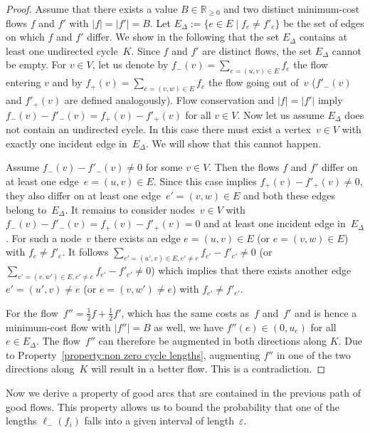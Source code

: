 \documentclass[11pt]{article}
\newcommand{\RR}{\mathbb{R}}
\newcommand{\e}{\varepsilon}
\renewcommand{\sp}{\ell}
\newcommand{\spm}[1][]{\sp^{#1}_{-}}
\begin{document}
\begin{proof}
Assume that there exists a value $B \in \RR_{\geq 0}$ and two distinct minimum-cost flows $f$ and $f'$ with $|f| = |f'| = B$. Let $E_{\Delta} := \{e \in E \mid f_e \neq f'_e\}$ be the set of edges on which $f$ and $f'$ differ. We show in the following that the set $E_{\Delta}$ contains at least one undirected cycle~$K$.
Since $f$ and $f'$ are distinct flows, the set $E_{\Delta}$ cannot be empty. For $v \in V$, let us denote by $f_-(v) = \sum_{e=(u,v) \in E} f_e$ the flow entering $v$ and by $f_+(v) = \sum_{e=(v,w) \in E} f_e$ the flow going out of~$v$ ($f'_-(v)$ and $f'_+(v)$ are defined analogously). Flow conservation and $|f| = |f'|$ imply $f_-(v) - f'_-(v) = f_+(v) - f'_+(v)$ for all $v \in V$. 
Now let us assume $E_{\Delta}$ does not contain an undirected cycle. In this case there must exist a vertex~$v \in V$ with exactly one incident edge in~$E_{\Delta}$. We will show that this cannot happen.

Assume $f_-(v) - f'_-(v) \neq 0$ for some $v \in V$. Then the flows $f$ and $f'$ differ on at least one edge~$e = (u,v) \in E$. Since this case implies $f_+(v) - f'_+(v) \neq 0$, they also differ on at least one edge~$e' = (v,w) \in E$ and both these edges belong to~$E_{\Delta}$. It remains to consider nodes~$v \in V$ with $f_-(v) - f'_-(v) = f_+(v) - f'_+(v) = 0$ and at least one incident edge in~$E_{\Delta}$. For such a node~$v$ there exists an edge $e = (u,v) \in E$ (or $e = (v,w) \in E$) with $f_e \neq f'_e$. It follows $\sum_{e'=(u',v) \in E, e' \neq e} f_{e'} - f'_{e'} \neq 0$ (or $\sum_{e'=(v,w') \in E, e' \neq e} f_{e'} - f'_{e'} \neq 0$) which implies that there exists another edge $e' = (u',v) \neq e$ (or $e = (v,w') \neq e$) with $f_{e'} \neq f'_{e'}$.

For the flow~$f'' = \frac{1}{2} f + \frac{1}{2} f'$, which has the same costs as~$f$ and~$f'$ and is hence a minimum-cost flow with $|f''|=B$ as well, we have $f''(e) \in (0,u_e)$ for all $e \in E_{\Delta}$. The flow~$f''$ can therefore be augmented in both directions along $K$. Due to Property~\ref{property:non zero cycle lengths}, augmenting $f''$ in one of the two directions along~$K$ will result in a better flow. This is a contradiction.
\end{proof}

Now we derive a property of good arcs that are contained in the previous path of good flows.
This property allows us to bound the probability that one of the lengths $\spm(f_i)$ falls into a given interval of length~$\e$.
\end{document}
